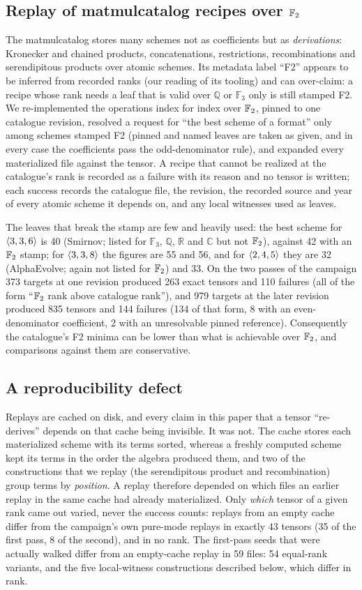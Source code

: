 \subsection{Replay of matmulcatalog recipes over ${\mathbb{F}_2}$}
The matmulcatalog stores many schemes not as coefficients but as \emph{derivations}: Kronecker and chained products, concatenations, restrictions, recombinations and serendipitous products over atomic schemes. Its metadata label ``F2'' appears to be inferred from recorded ranks (our reading of its tooling) and can over-claim: a recipe whose rank needs a leaf that is valid over
$\mathbb Q$ or $\mathbb F_3$ only is still stamped F2. We re-implemented the operations index for index over ${\mathbb{F}_2}$, pinned to one catalogue revision, resolved a request for ``the best scheme of a format'' only among schemes stamped F2 (pinned and named leaves are taken as given, and in every case the coefficients pass the odd-denominator rule), and expanded every materialized file against the tensor.
A recipe that cannot be realized at the catalogue's rank is recorded as a failure with its reason and no tensor is written; each success records the catalogue file, the revision, the recorded source and year of every atomic scheme it depends on, and any local witnesses used as leaves.

The leaves that break the stamp are few and heavily used: the best scheme for $\langle 3,3,6\rangle$ is 40 (Smirnov; listed for $\mathbb F_3$, $\mathbb Q$, $\mathbb R$ and $\mathbb C$ but not ${\mathbb{F}_2}$), against 42 with an ${\mathbb{F}_2}$ stamp; for $\langle 3,3,8\rangle$ the figures are 55 and 56, and for $\langle 2,4,5\rangle$ they are 32 (AlphaEvolve; again not listed for ${\mathbb{F}_2}$) and 33.
On the two passes of the campaign 373 targets at one revision produced 263 exact tensors and 110 failures (all of the form ``${\mathbb{F}_2}$ rank above catalogue rank''), and 979 targets at the later revision produced 835 tensors and 144 failures (134 of that form, 8 with an even-denominator coefficient, 2 with an unresolvable pinned reference).
Consequently the catalogue's F2 minima can be lower than what is achievable over ${\mathbb{F}_2}$, and comparisons against them are conservative.

\subsection{A reproducibility defect}\label{sec:cachebug}
Replays are cached on disk, and every claim in this paper that a tensor ``re-derives'' depends on that cache being invisible. It was not. The cache stores each materialized scheme with its terms sorted, whereas a freshly computed scheme kept its terms in the order the algebra produced them,
and two of the constructions that we replay (the serendipitous product and recombination) group terms by \emph{position}. A replay therefore depended on which files an earlier replay in the same cache had already materialized. Only \emph{which} tensor of a given rank came out varied, never the success counts: replays from an empty cache differ from the campaign's own pure-mode replays in exactly 43 tensors (35 of the first pass, 8 of the second), and in no rank.
The first-pass seeds that were actually walked differ from an empty-cache replay in 59 files: 54 equal-rank variants, and the five local-witness constructions described below, which differ in rank.

